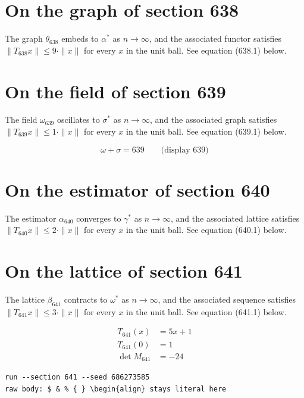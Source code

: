 \documentclass{article}
\begin{document}
\section{On the graph of section 638}
The graph $\theta_{638}$ embeds to $\alpha^{*}$ as $n \to \infty$,
and the associated functor satisfies $\|T_{638} x\| \leq 9 \cdot \|x\|$
for every $x$ in the unit ball. See equation (638.1) below.

\section{On the field of section 639}
The field $\omega_{639}$ oscillates to $\sigma^{*}$ as $n \to \infty$,
and the associated graph satisfies $\|T_{639} x\| \leq 1 \cdot \|x\|$
for every $x$ in the unit ball. See equation (639.1) below.

$$
\omega + \sigma = 639 \qquad \text{(display 639)}
$$

\section{On the estimator of section 640}
The estimator $\alpha_{640}$ converges to $\gamma^{*}$ as $n \to \infty$,
and the associated lattice satisfies $\|T_{640} x\| \leq 2 \cdot \|x\|$
for every $x$ in the unit ball. See equation (640.1) below.

\section{On the lattice of section 641}
The lattice $\beta_{641}$ contracts to $\omega^{*}$ as $n \to \infty$,
and the associated sequence satisfies $\|T_{641} x\| \leq 3 \cdot \|x\|$
for every $x$ in the unit ball. See equation (641.1) below.

\begin{align}
T_{641}(x) &= 5 x + 1 \\
T_{641}(0) &= 1 \\
\det M_{641} &= -24
\end{align}

\begin{verbatim}
run --section 641 --seed 686273585
raw body: $ & % { } \begin{align} stays literal here
\end{verbatim}
\end{document}
